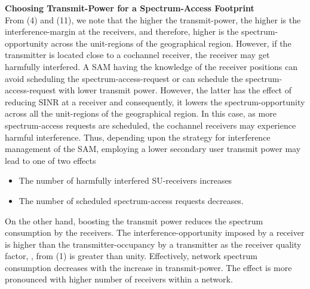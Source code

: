 \documentclass[12pt, draftclsnofoot, onecolumn]{IEEEtran}
\begin{document}
\noindent
\textbf{Choosing Transmit-Power for a Spectrum-Access Footprint}\\
From (4) and (11), we note that the higher the transmit-power, the higher is the interference-margin at the receivers, and therefore, higher is the spectrum-opportunity across the unit-regions of the geographical region. However, if the transmitter is located close to a cochannel receiver, the receiver may get harmfully interfered. A SAM having the knowledge of the receiver positions can avoid scheduling the spectrum-access-request or can schedule the spectrum-access-request with lower transmit power. However, the latter has the effect of reducing SINR at a receiver and consequently, it lowers the spectrum-opportunity across all the unit-regions of the geographical region. In this case, as more spectrum-access requests are scheduled, the cochannel receivers may experience harmful interference. Thus, depending upon the strategy for interference management of the SAM, employing a lower secondary user transmit power may lead to one of two effects
\begin{itemize}
	\item The number of harmfully interfered SU-receivers increases
	\item The number of scheduled spectrum-access requests decreases.
\end{itemize}
On the other hand, boosting the transmit power reduces the spectrum consumption by the receivers. The interference-opportunity imposed by a receiver is higher than the transmitter-occupancy by a transmitter as the receiver quality factor, , from (1) is greater than unity. Effectively, network spectrum consumption decreases with the increase in transmit-power. The effect is more pronounced with higher number of receivers within a network.
\end{document}
